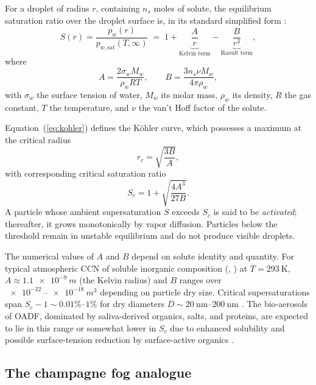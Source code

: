 \documentclass[11pt,a4paper]{article}
\newcommand{\pwsat}{p_{w,\text{sat}}}
\theoremstyle{definition}
\theoremstyle{plain}
\begin{document}
For a droplet of radius $r$, containing $n_s$ moles of solute, the equilibrium saturation ratio over the droplet surface is, in its standard simplified form \citep{Rogers1989}:
\begin{equation}
\label{eq:kohler}
S(r) = \frac{p_w(r)}{\pwsat(T,\infty)} \;=\; 1 + \underbrace{\frac{A}{r}}_{\text{Kelvin term}} - \underbrace{\frac{B}{r^3}}_{\text{Raoult term}},
\end{equation}
where
\begin{equation}
\label{eq:AB}
A = \frac{2\sigma_w M_w}{\rho_w R T}, \qquad
B = \frac{3 n_s \nu M_w}{4\pi \rho_w},
\end{equation}
with $\sigma_w$ the surface tension of water, $M_w$ its molar mass, $\rho_w$ its density, $R$ the gas constant, $T$ the temperature, and $\nu$ the van't Hoff factor of the solute.

Equation~(\ref{eq:kohler}) defines the Köhler curve, which possesses a maximum at the critical radius
\begin{equation}
\label{eq:rcrit}
r_c = \sqrt{\frac{3B}{A}},
\end{equation}
with corresponding critical saturation ratio
\begin{equation}
\label{eq:Scrit}
S_c = 1 + \sqrt{\frac{4 A^3}{27 B}}.
\end{equation}
A particle whose ambient supersaturation $S$ exceeds $S_c$ is said to be \emph{activated}; thereafter, it grows monotonically by vapor diffusion. Particles below the threshold remain in unstable equilibrium and do not produce visible droplets.

The numerical values of $A$ and $B$ depend on solute identity and quantity. For typical atmospheric CCN of soluble inorganic composition (, ) at $T = \SI{293}{\kelvin}$, $A \approx \SI{1.1e-9}{m}$ (the Kelvin radius) and $B$ ranges over $\SI{e-22}{}\!\text{--}\!\SI{e-18}{m^3}$ depending on particle dry size. Critical supersaturations span $S_c - 1 \sim 0.01\%\text{--}1\%$ for dry diameters $D \sim \SIrange{20}{200}{\nano\meter}$ \citep{SeinfeldPandis2016}. The bio-aerosols of OADF, dominated by saliva-derived organics, salts, and proteins, are expected to lie in this range or somewhat lower in $S_c$ due to enhanced solubility and possible surface-tension reduction by surface-active organics \citep{Facchini1999,Sorjamaa2004}.

\subsection{The champagne fog analogue}
\label{sec:champagne}
\end{document}
